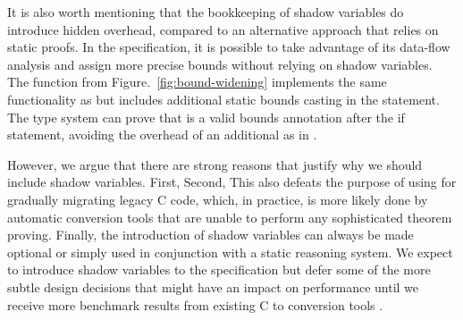 It is also worth mentioning that the bookkeeping of shadow variables do
introduce hidden overhead, compared to an alternative approach that
relies on static proofs. In the \checkedc specification, it is
possible to take advantage of its data-flow analysis and assign more
precise bounds without relying on shadow variables. The function
 from Figure.~\ref{fig:bound-widening} implements the same
functionality as  but includes additional static bounds casting in the
 statement. The type system can prove that
 is a valid bounds annotation after the if statement,
avoiding the overhead of an additional  as in .

However, we argue that there are strong reasons that justify
why we should include shadow variables. First,  Second,   This also
defeats the purpose of using \checkedc for gradually migrating legacy C code,
which, in practice, is more likely done by automatic
conversion tools that are unable to perform any sophisticated
theorem proving. Finally, the introduction of shadow variables can
always be made optional or simply used in conjunction with a static reasoning
system.  We expect to introduce
shadow variables to the \checkedc specification but defer some of the
more subtle design decisions that might have an impact on performance
until we receive more benchmark results from existing C to \checkedc
conversion tools .








